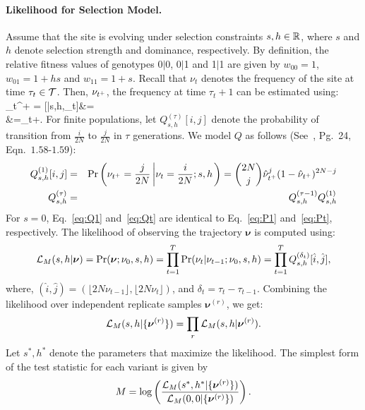 \documentclass[11pt]{article}
\begin{document}
\paragraph{Likelihood for Selection Model.}
Assume that the site is evolving under selection constraints $s,h\in
{\mathbb R}$, where $s$ and $h$ denote selection strength and dominance,
respectively. By definition, the relative fitness values of genotypes
0$|$0, 0$|$1 and 1$|$1 are given by $w_{00}=1$, $w_{01}=1+hs$ and
$w_{11}=1+s$. Recall that $\nu_t$ denotes the frequency of the site at
time $\tau_t\in {\cal T}$. Then, $\nu_{t^+}$, the frequency at time
$\tau_t+1$ can be estimated using: \beq \hat{\nu}_{t^+} =
[\nusp|s,h,\nu_t]&=\\
&=\nu_t+.
  \label{eq:transition}
\eeq
For finite populations, let $Q^{(\tau)}_{s,h}[i,j]$ denote the
probability of transition from $\frac{i}{2N}$ to $\frac{j}{2N}$ in
$\tau$ generations. We model $Q$ as follows
(See~\cite{Ewens2012Mathematical}, Pg.~24, Eqn.~$1.58$-$1.59$):
\begin{eqnarray}
  Q^{(1)}_{s,h}[i,j] &=& \operatorname{Pr}\left(\nu_{t^+}=\frac{j}{2N} \left\lvert
      \nu_{t}=\frac{i}{2N};s,h \right .\right)={2N \choose j}
  \hat{\nu}_{t^+}^{j} (1-\hat{\nu}_{t^+})^{2N-j}\label{eq:Q1}\\
  Q^{(\tau)}_{s,h} &=& Q^{(\tau-1)}_{s,h}Q^{(1)}_{s,h}\label{eq:Qt}
  \label{eq:mkvs}   
\end{eqnarray}
For $s=0$, Eq.~\ref{eq:Q1} and~\ref{eq:Qt} are identical to
Eq.~\ref{eq:P1} and~\ref{eq:Pt}, respectively.  The likelihood of
observing the trajectory $\bm{\nu}$ is computed using:
\begin{equation}
  {\cal L}_M(s,h|\bm{\nu}) = \operatorname{Pr}(\bm{\nu};\nu_0,s,h)=
  \prod_{t=1}^{T} \operatorname{Pr}(\nu_{t}|\nu_{t-1};\nu_0,s,h) = \prod_{t=1}^{T} Q^{(\delta_t)}_{s,h}[\hat{i},\hat{j}],
\end{equation}
where, $(\hat{i},\hat{j})=(\lfloor 2N\nu_{t-1}\rfloor, \lfloor
2N\nu_{t}\rfloor)$, and $\delta_t=\tau_{t}-\tau_{t-1}$. Combining the
likelihood over independent replicate samples $\bm{\nu}^{(r)}$, we
get:
\begin{equation}
  {\cal L}_M(s,h|\{\bm{\nu}^{(r)}\}) = \prod_r   {\cal L}_M(s,h|\bm{\nu}^{(r)}).
  \label{eq:mkvlik}
\end{equation}
Let $s^*,h^*$ denote the parameters that maximize the likelihood. The
simplest form of the test statistic for each variant is given by
\begin{eqnarray}
M= \log 
\left(\frac{{\cal L}_M(s^*,h^*|\{\bm{\nu}^{(r)}\})}{{\cal L}_M(0,0|\{\bm{\nu}^{(r)}\})}\right).
\label{eq:mcts}
\end{eqnarray}
\end{document}
